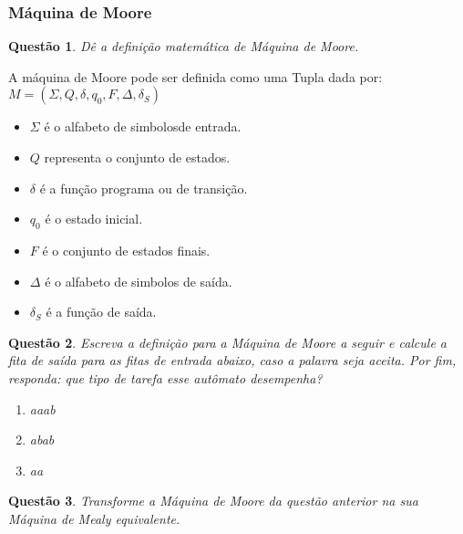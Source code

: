 \documentclass{article}
\newtheorem{problem}{Questão}
\begin{document}
        \subsubsection{Máquina de Moore}
            \begin{problem}
                    Dê a definição matemática de Máquina de Moore.
            \end{problem}
    \begin{solution}
        
      A máquina de Moore pode ser definida como uma Tupla dada por:
         $M = (\Sigma, Q, \delta, q_0, F, \Delta, \delta_S)$
        
        \begin{itemize}
        \item $\Sigma$ é o alfabeto de simbolosde entrada.
        \item $Q$ representa o conjunto de estados.
        \item $\delta$ é a função programa ou de transição.
        \item $q_0$ é o estado inicial.
        \item $F$ é o conjunto de estados finais.
        \item $\Delta$ é o alfabeto de simbolos de saída.
        \item $\delta_S$ é a função de saída.
        \end{itemize}
            
        
    \end{solution}
            \begin{problem}
                Escreva a definição para a Máquina de Moore a seguir e calcule a fita de saída para as fitas de entrada abaixo, caso a palavra seja aceita. Por fim, responda: que tipo de tarefa esse autômato desempenha? 
                 
                \begin{enumerate}[label=(\alph*)]
                        \item aaab
                        \item abab
                        \item aa
                    \end{enumerate}
                 
            \end{problem}
            \begin{solution}
        
    \end{solution}
            \begin{problem}
                  Transforme a Máquina de Moore da questão anterior na sua Máquina de Mealy equivalente.
            \end{problem}
            \begin{solution}
        
    \end{solution}
\end{document}
